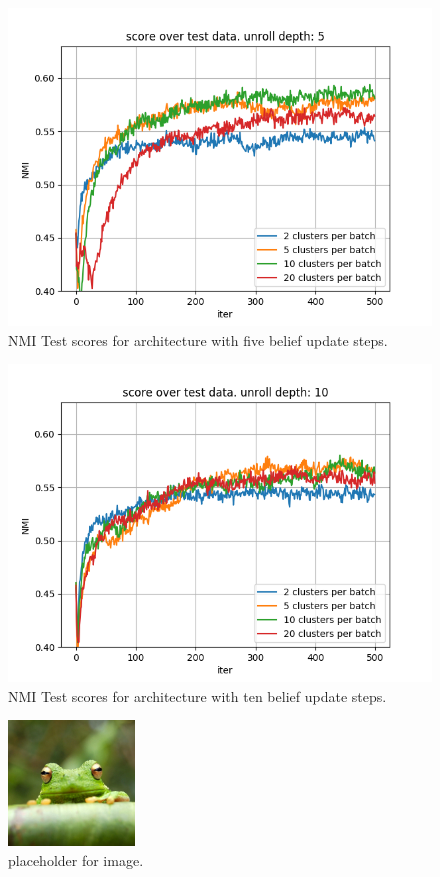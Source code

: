 \begin{figure}[h!]
\centering
\includegraphics[width=1\textwidth]{imgs/cub_test_500/square/depth5.png}
\caption{\label{fig:cub_test_500} NMI Test scores for architecture with five belief update steps.}
\end{figure}
\begin{figure}[h!]
\centering
\includegraphics[width=1\textwidth]{imgs/cub_test_500/square/depth10.png}
\caption{\label{fig:cub_test_500} NMI Test scores for architecture with ten belief update steps.}
\end{figure}
\begin{figure}[h!]
\centering
\includegraphics[width=0.3\textwidth]{imgs/frog.jpg}
\caption{\label{fig:frog}placeholder for image.}
\end{figure}
